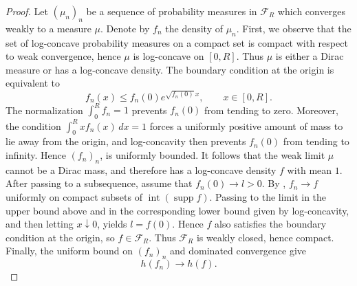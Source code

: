\documentclass{article}
\theoremstyle{plain}
\theoremstyle{definition}
\newcommand{\1}{\mathbf 1}
\begin{document}
\begin{proof}


Let $(\mu_n)_n$ be a sequence of probability measures in $\mathcal F_R $  which converges weakly to a measure $\mu$. Denote by $f_n$  the density of $\mu_n$. 
First, we observe that the set of log-concave probability measures on a compact set is compact with respect to weak convergence, hence $\mu$ is log-concave on $[0,R]$. Thus $\mu$ is either a Dirac measure or has a log-concave density.
The boundary condition at the origin is equivalent to
\[
f_n(x)\leq f_n(0)e^{\sqrt{f_n(0)}\,x},
\qquad x\in[0,R].
\]
The normalization $\int_0^R f_n=1$ prevents $f_n(0)$ from tending to
zero. Moreover, the condition $\int_0^R xf_n(x)\,dx=1$ forces a
uniformly positive amount of mass to lie away from the origin, and
log-concavity then prevents $f_n(0)$ from tending to infinity.
Hence $(f_n)_n$, is uniformly bounded. It follows that the weak limit $\mu$ cannot be a Dirac mass, and
therefore has a log-concave density $f$ with mean $1$. After passing
to a subsequence, assume that $f_n(0)\to l>0$. By
\cite[Fact~2.5]{corderofradelizi}, $f_n\to f$ uniformly on compact
subsets of $\operatorname{int}(\operatorname{supp}f)$. Passing to the
limit in the upper bound above and in the corresponding lower bound
given by log-concavity, and then letting $x\downarrow0$, yields
$l=f(0)$. Hence $f$ also satisfies the boundary condition at the origin, so
$f\in\mathcal F_R$. Thus $\mathcal F_R$ is weakly closed, hence
compact. Finally, the uniform bound on $(f_n)_n$ and dominated
convergence give
\[
h(f_n)\longrightarrow h(f).
\]

\end{proof}
\end{document}
